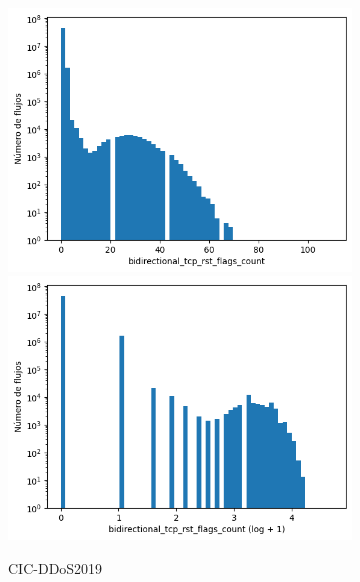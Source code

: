 \begin{figure}[H]
    \centering
    \hfill
    \begin{subfigure}[b]{0.32\textwidth}
        \centering
        \includegraphics[width=\textwidth]{media/packet_pincer_cicddos/bidirectional_tcp_rst_flags_count_linear_x_log_y.png}
        \includegraphics[width=\textwidth]{media/packet_pincer_cicddos/bidirectional_tcp_rst_flags_count_log_x_log_y.png}
        \caption{CIC-DDoS2019}
    \end{subfigure}
    \hfill
    \begin{subfigure}[b]{0.32\textwidth}
        \centering

\end{subfigure}
\end{figure}
